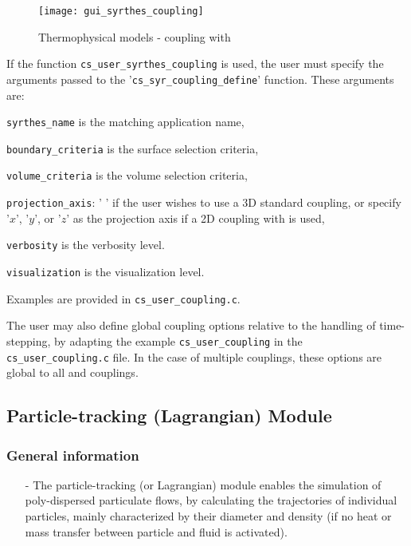 {{{\begin{figure}[ht]
\begin{center}
\texttt{[image: gui\_syrthes\_coupling]}
\caption{Thermophysical models - coupling with \syrthes}
\label{fig:syrthes}
\end{center}
\end{figure}

If the function \texttt{cs\_user\_syrthes\_coupling} is used, the user must
specify the arguments passed to the '\texttt{cs\_syr\_coupling\_define}' function.
 These arguments are:
\begin{list}{-}{}
 \item \texttt{syrthes\_name} is the matching \syrthes application name,
 \item \texttt{boundary\_criteria} is the surface selection criteria,
 \item \texttt{volume\_criteria} is the volume selection criteria,
 \item \texttt{projection\_axis}: ' ' if the user wishes to use a 3D standard coupling,
 or specify '$x$', '$y$', or '$z$' as the projection axis if a 2D coupling with \syrthes is used,
 \item \texttt{verbosity} is the verbosity level.
 \item \texttt{visualization} is the visualization level.
\end{list}
Examples are provided in \texttt{cs\_user\_coupling.c}.

The user may also define global coupling options relative to the handling of
time-stepping, by adapting the example \texttt{cs\_user\_coupling}
in the \texttt{cs\_user\_coupling.c} file. In the case of multiple couplings,
these options are global to all \syrthes and \CS couplings.

\subsection{Particle-tracking (Lagrangian) Module}

\subsubsection{General information}\label{sec:over-lag}

\begin{itemize} 

\item[-] The particle-tracking (or Lagrangian) module enables the simulation of poly-dispersed particulate flows, by calculating the trajectories of individual particles, mainly characterized by their diameter and density (if no heat or mass transfer between particle and fluid is activated). 


\end{itemize}}}}
